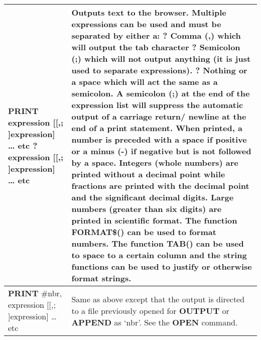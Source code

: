 \begin{table}[]
\begin{tabular}{|p{4cm}|p{10cm}|}
\textbf{PRINT} expression [[,; ]expression] … etc\newline
\textbf{?} expression [[,; ]expression] … etc
& Outputs text to the browser. Multiple expressions can be used and must be
separated by either a: \newline
\textbf{?} Comma (,) which will output the tab character \newline
\textbf{?} Semicolon (;) which will not output anything (it is just used to separate expressions).\newline
\textbf{?} Nothing or a space which will act the same as a semicolon.\newline
A semicolon (;) at the end of the expression list will suppress the
automatic output of a carriage return/ newline at the end of a print
statement.\newline
When printed, a number is preceded with a space if positive or a minus
(-) if negative but is not followed by a space. Integers (whole numbers)
are printed without a decimal point while fractions are printed with the
decimal point and the significant decimal digits. Large numbers (greater
than six digits) are printed in scientific format.\newline
The function \textbf{FORMAT\$()} can be used to format numbers. The function
\textbf{TAB()} can be used to space to a certain column and the string functions
can be used to justify or otherwise format strings.
\\ \hline
\textbf{PRINT} \#nbr, expression
[[,; ]expression] … etc
& Same as above except that the output is directed to a file previously
opened for \textbf{OUTPUT} or \textbf{APPEND} as ‘nbr’. See the \textbf{OPEN} command.
\\ \hline
\end{tabular}
\end{table}

